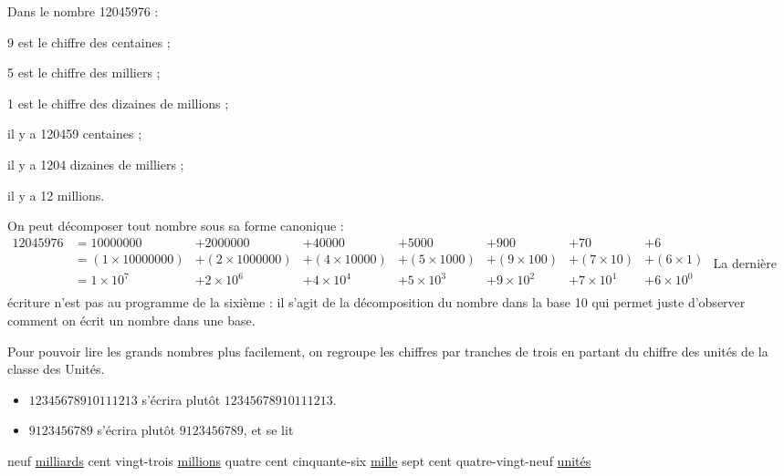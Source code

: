 \begin{exemple*1}
   Dans le nombre \num{12045976} :
   \begin{colitemize}{2}
      \item 9 est le chiffre des centaines ;
      \item 5 est le chiffre des milliers ;
      \item 1 est le chiffre des dizaines de millions ;
      \item il y a \num{120459} centaines ;
      \item il y a \num{1204} dizaines de milliers ;
      \item il y a 12 millions.
   \end{colitemize}
\end{exemple*1}

\begin{remarques}
    On peut décomposer tout nombre sous sa forme canonique : \\
    $\begin{array}{*{8}{l}}
    \num{12045976} & =\num{10000000} & + \num{2000000} & + \num{40000} & + \num{5000} & + 900 & + 70 & + 6 \\
        & =(1\times\num{10000000}) & + (2\times\num{1000000}) & + (4\times\num{10000}) & +(5\times\num{1000}) & +(9\times100) & +(7\times10) & +(6\times1) \\
        & =1\times10^7 & +2\times10^6 & +4\times10^4 & +5\times10^3 & +9\times10^2 & +7\times10^1 & +6\times10^0 \\
    \end{array}$
    La dernière écriture n'est pas au programme de la sixième : il s'agit de la décomposition du nombre dans la base 10 qui permet juste d'observer comment on écrit un nombre dans une base.
\end{remarques}

\begin{propriete}
    Pour pouvoir lire les grands nombres plus facilement, on regroupe les chiffres par tranches de trois en partant du chiffre des unités de la classe des Unités.
\end{propriete}

\begin{exemple*1}
    \begin{itemize}
        \item $12345678910111213$ s'écrira plutôt $\num{12345678910111213}$.
        \item $9123456789$ s'écrira plutôt $\num{9123456789}$, et se lit 
    \end{itemize}
    \begin{center}
        {\footnotesize \og neuf \underline{milliards} cent vingt-trois \underline{millions} quatre cent cinquante-six \underline{mille} sept cent quatre-vingt-neuf \underline{unités} \fg}
    \end{center}
\end{exemple*1}

